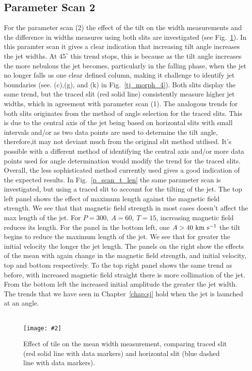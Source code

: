 \documentclass[12pt]{ociamthesis}
\newcommand{\mfig}[4]{
  \begin{figure}
  \begin{center}
  \texttt{[image: \#2]}
  \caption{#3}
  \label{#4}
  \end{center}
  \end{figure}}
\newcommand{\kms}{~\rm{km ~s^{-1}}}
\newcommand{\np}{\\ \\}
\begin{document}
\subsection{Parameter Scan 2}
\label{subsec:pscansII_I}
For the parameter scan (2) the effect of the tilt on the width measurements and the difference in widths measures using both slits are investigated (see Fig.~\ref{width_measure}). In this paramter scan it gives a clear indication that increasing tilt angle increases the jet widths. At $45^{\circ}$ this trend stops, this is because as the tilt angle increases the more nebulous the jet becomes, particularly in the falling phase, when the jet no longer falls as one clear defined column, making it challenge to identify jet boundaries (see. (c),(g), and (k) in Fig.~\ref{tj_morph_4}). Both slits display the same trend, but the traced slit (red solid line) consistently measure higher jet widths, which in agreement with parameter scan (1). The analogous trends for both slits originates from the method of angle selection for the traced slits. This is due to the central axis of the jet being based on horizontal slits with small intervals and/or as two data points are used to determine the tilt angle, therefore,it may not deviant much from the original slit method utilised. It's possible with a different method of identifying the central axis and/or more data points used for angle determination would modify the trend for the traced slits. Overall, the less sophisticated method currently used gives a good indication of the expected results.  
%
%
%
In Fig.~\ref{p_scan_t_len} the same parameter scan is investigated, but using a traced slit to account for the tilting of the jet. The top left panel shows the effect of maximum length against the magnetic field strength. We see that that magnetic field strength in most cases doesn’t affect the max length of the jet. For $P=300,~A=60,~T=15$, increasing magnetic field reduces its length. For the panel in the bottom left, one $A>40 \kms$  the tilt begins to reduce the maximum length of the jet. We see that for greater the initial velocity the longer the jet length. The panels on the right show the effects of the mean with again change in the magnetic field strength, and initial velocity, top and bottom respectively. To the top right panel shows the same trend as before, with increased magnetic field straight there is more collimation of the jet. From the bottom left the increased initial amplitude the greater the jet width. The trends that we have seen in Chapter~\ref{chap:sj} hold when the jet is launched at an angle.  \np
\mfig{1}{figures/mean_w_vs_tilt.png}{Effect of tile on the mean width measurement, comparing traced slit (red solid line with data markers) and horizontal slit (blue dashed line with data markers).}{width_measure}
\end{document}
